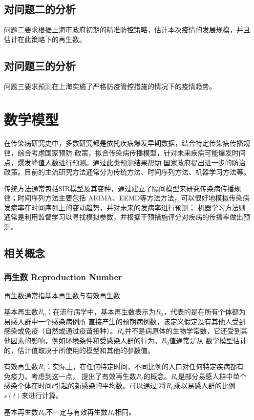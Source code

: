 \documentclass[bwprint]{gmcmthesis}
\numberwithin{figure}{section}
\begin{document}
\subsection{对问题二的分析}
问题二要求根据上海市政府初期的精准防控策略，估计本次疫情的发展规模，并且估计在此策略下的再生数。
\subsection{对问题三的分析}
问题三要求预测在上海实施了严格防疫管控措施的情况下的疫情趋势。

\section{数学模型}
\par 在传染病研究史中，多数研究都是依托疾病爆发早期数据，结合特定传染病传播规律，综合考虑国家预防
政策，拟合传染病传播模型，针对未来疾病可能爆发时间点，爆发峰值人数进行预测。通过此类预测结果帮助
国家政府提出进一步的防治政策。目前的主流研究方法通常分为传统方法、时间序列方法、机器学习方法等。
\par 传统方法通常包括SIR模型及其变种，通过建立了隔间模型来研究传染病传播规律；时间序列方法主要包括
ARIMA、EEMD等方法方法，可以很好地模拟传染病发病率在时间序列上的变动趋势，并对未来的发病率进行预测；
机器学习方法则通常是利用监督学习以寻找模拟参数，并根据干预措施评分对疾病的传播率做出预测。

\subsection{相关概念}
\subsubsection{再生数 Reproduction Number}
再生数通常指基本再生数与有效再生数

\par 基本再生数$R_0$：在流行病学中，基本再生数表示为$R_0$，代表的是在所有个体都为易感人群中一个感染病例所
直接产生的预期病例数，该定义假定没有其他人受到感染或免疫（自然或通过疫苗接种）。$R_0$并不是病原体的生物学常数，它还受到其他因素的影响，例如环境条件和受感染人群的行为。$R_0$值通常是从
数学模型估计的，估计值取决于所使用的模型和其他的参数值。
\par 有效再生数$R_t$：实际上，在任何特定时间，不同比例的人口对任何特定疾病都有免疫力。考虑到这一点，
提出了有效再生数$R_t$的概念。$R_t$是部分易感人群中单个感染个体在时间$t$引起的新感染的平均数。可以通过
将$R_0$乘以易感人群的比例$s\left( t \right)$来进行计算。
\par 基本再生数$R_0$不一定与有效再生数$R_t$相同。
\end{document}

